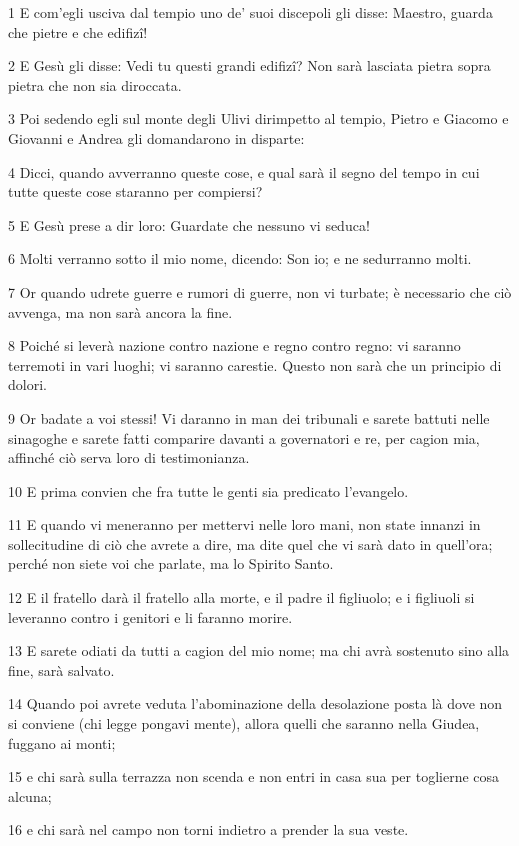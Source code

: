 \par 1 E com'egli usciva dal tempio uno de' suoi discepoli gli disse: Maestro, guarda che pietre e che edifizî!
\par 2 E Gesù gli disse: Vedi tu questi grandi edifizî? Non sarà lasciata pietra sopra pietra che non sia diroccata.
\par 3 Poi sedendo egli sul monte degli Ulivi dirimpetto al tempio, Pietro e Giacomo e Giovanni e Andrea gli domandarono in disparte:
\par 4 Dicci, quando avverranno queste cose, e qual sarà il segno del tempo in cui tutte queste cose staranno per compiersi?
\par 5 E Gesù prese a dir loro: Guardate che nessuno vi seduca!
\par 6 Molti verranno sotto il mio nome, dicendo: Son io; e ne sedurranno molti.
\par 7 Or quando udrete guerre e rumori di guerre, non vi turbate; è necessario che ciò avvenga, ma non sarà ancora la fine.
\par 8 Poiché si leverà nazione contro nazione e regno contro regno: vi saranno terremoti in vari luoghi; vi saranno carestie. Questo non sarà che un principio di dolori.
\par 9 Or badate a voi stessi! Vi daranno in man dei tribunali e sarete battuti nelle sinagoghe e sarete fatti comparire davanti a governatori e re, per cagion mia, affinché ciò serva loro di testimonianza.
\par 10 E prima convien che fra tutte le genti sia predicato l'evangelo.
\par 11 E quando vi meneranno per mettervi nelle loro mani, non state innanzi in sollecitudine di ciò che avrete a dire, ma dite quel che vi sarà dato in quell'ora; perché non siete voi che parlate, ma lo Spirito Santo.
\par 12 E il fratello darà il fratello alla morte, e il padre il figliuolo; e i figliuoli si leveranno contro i genitori e li faranno morire.
\par 13 E sarete odiati da tutti a cagion del mio nome; ma chi avrà sostenuto sino alla fine, sarà salvato.
\par 14 Quando poi avrete veduta l'abominazione della desolazione posta là dove non si conviene (chi legge pongavi mente), allora quelli che saranno nella Giudea, fuggano ai monti;
\par 15 e chi sarà sulla terrazza non scenda e non entri in casa sua per toglierne cosa alcuna;
\par 16 e chi sarà nel campo non torni indietro a prender la sua veste.
